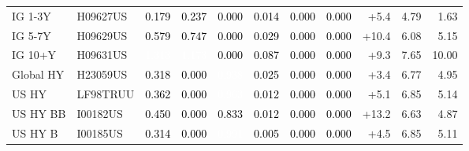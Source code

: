 \documentclass[a4paper,review]{cas-sc}
\begin{document}
\begin{table}[pos=htbp]
\begin{adjustbox}{max width=\linewidth}
\begin{tabular}{llrrrrrrrrr}
IG 1-3Y & H09627US & \cellcolor[HTML]{FBE6DA}\textcolor{black}{0.179} & \cellcolor[HTML]{FCE0D0}\textcolor{black}{0.237} & \cellcolor[HTML]{FFFFFF}\textcolor{black}{0.000} & \cellcolor[HTML]{F7F5F4}\textcolor{black}{0.014} & \cellcolor[HTML]{FFFFFF}\textcolor{black}{0.000} & \cellcolor[HTML]{FFFFFF}\textcolor{black}{0.000} & +5.4 & 4.79 & 1.63 \\
IG 5-7Y & H09629US & \cellcolor[HTML]{F5A886}\textcolor{black}{0.579} & \cellcolor[HTML]{E58368}\textcolor{black}{0.747} & \cellcolor[HTML]{FFFFFF}\textcolor{black}{0.000} & \cellcolor[HTML]{F8F4F2}\textcolor{black}{0.029} & \cellcolor[HTML]{FFFFFF}\textcolor{black}{0.000} & \cellcolor[HTML]{FFFFFF}\textcolor{black}{0.000} & +10.4 & 6.08 & 5.15 \\
IG 10+Y & H09631US & \cellcolor[HTML]{930E26}\textcolor{white}{1.313} & \cellcolor[HTML]{B41C2D}\textcolor{white}{1.173} & \cellcolor[HTML]{FFFFFF}\textcolor{black}{0.000} & \cellcolor[HTML]{F9EFE9}\textcolor{black}{0.087} & \cellcolor[HTML]{FFFFFF}\textcolor{black}{0.000} & \cellcolor[HTML]{FFFFFF}\textcolor{black}{0.000} & +9.3 & 7.65 & 10.00 \\
Global HY & H23059US & \cellcolor[HTML]{FCD7C2}\textcolor{black}{0.318} & \cellcolor[HTML]{FFFFFF}\textcolor{black}{0.000} & \cellcolor[HTML]{D05548}\textcolor{white}{0.938} & \cellcolor[HTML]{F8F4F2}\textcolor{black}{0.025} & \cellcolor[HTML]{FFFFFF}\textcolor{black}{0.000} & \cellcolor[HTML]{FFFFFF}\textcolor{black}{0.000} & +3.4 & 6.77 & 4.95 \\
US HY & LF98TRUU & \cellcolor[HTML]{FBD0B9}\textcolor{black}{0.362} & \cellcolor[HTML]{FFFFFF}\textcolor{black}{0.000} & \cellcolor[HTML]{CE4F45}\textcolor{white}{0.963} & \cellcolor[HTML]{F7F5F4}\textcolor{black}{0.012} & \cellcolor[HTML]{FFFFFF}\textcolor{black}{0.000} & \cellcolor[HTML]{FFFFFF}\textcolor{black}{0.000} & +5.1 & 6.85 & 5.14 \\
US HY BB & I00182US & \cellcolor[HTML]{F8BFA4}\textcolor{black}{0.450} & \cellcolor[HTML]{FFFFFF}\textcolor{black}{0.000} & \cellcolor[HTML]{DC6E57}\textcolor{black}{0.833} & \cellcolor[HTML]{F7F5F4}\textcolor{black}{0.012} & \cellcolor[HTML]{FFFFFF}\textcolor{black}{0.000} & \cellcolor[HTML]{FFFFFF}\textcolor{black}{0.000} & +13.2 & 6.63 & 4.87 \\
US HY B & I00185US & \cellcolor[HTML]{FDD9C4}\textcolor{black}{0.314} & \cellcolor[HTML]{FFFFFF}\textcolor{black}{0.000} & \cellcolor[HTML]{CB4942}\textcolor{white}{0.991} & \cellcolor[HTML]{F7F6F6}\textcolor{black}{0.005} & \cellcolor[HTML]{FFFFFF}\textcolor{black}{0.000} & \cellcolor[HTML]{FFFFFF}\textcolor{black}{0.000} & +4.5 & 6.85 & 5.11 \\

\end{tabular}
\end{adjustbox}
\end{table}
\end{document}
